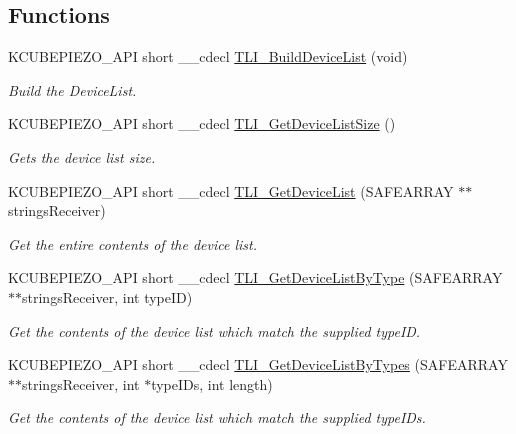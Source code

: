 \subsection*{Functions}
\begin{DoxyCompactItemize}
\item 
K\+C\+U\+B\+E\+P\+I\+E\+Z\+O\+\_\+\+A\+PI short \+\_\+\+\_\+cdecl \hyperlink{group___k_cube_piezo_gab6828a5e531b086cda3ae73a69f74ee6}{T\+L\+I\+\_\+\+Build\+Device\+List} (void)
\begin{DoxyCompactList}\small\item\em Build the Device\+List. \end{DoxyCompactList}\item 
K\+C\+U\+B\+E\+P\+I\+E\+Z\+O\+\_\+\+A\+PI short \+\_\+\+\_\+cdecl \hyperlink{group___k_cube_piezo_ga2f060ca4d8c6af365c33f11a0a823184}{T\+L\+I\+\_\+\+Get\+Device\+List\+Size} ()
\begin{DoxyCompactList}\small\item\em Gets the device list size. \end{DoxyCompactList}\item 
K\+C\+U\+B\+E\+P\+I\+E\+Z\+O\+\_\+\+A\+PI short \+\_\+\+\_\+cdecl \hyperlink{group___k_cube_piezo_ga5abcb54a4ea8e490a9e6833544eb222b}{T\+L\+I\+\_\+\+Get\+Device\+List} (S\+A\+F\+E\+A\+R\+R\+AY $\ast$$\ast$strings\+Receiver)
\begin{DoxyCompactList}\small\item\em Get the entire contents of the device list. \end{DoxyCompactList}\item 
K\+C\+U\+B\+E\+P\+I\+E\+Z\+O\+\_\+\+A\+PI short \+\_\+\+\_\+cdecl \hyperlink{group___k_cube_piezo_gacf77a9e2216306f7e9db1e7bd4f4219f}{T\+L\+I\+\_\+\+Get\+Device\+List\+By\+Type} (S\+A\+F\+E\+A\+R\+R\+AY $\ast$$\ast$strings\+Receiver, int type\+ID)
\begin{DoxyCompactList}\small\item\em Get the contents of the device list which match the supplied type\+ID. \end{DoxyCompactList}\item 
K\+C\+U\+B\+E\+P\+I\+E\+Z\+O\+\_\+\+A\+PI short \+\_\+\+\_\+cdecl \hyperlink{group___k_cube_piezo_gadcb307bcf088e1e0aab9efcd571b12e7}{T\+L\+I\+\_\+\+Get\+Device\+List\+By\+Types} (S\+A\+F\+E\+A\+R\+R\+AY $\ast$$\ast$strings\+Receiver, int $\ast$type\+I\+Ds, int length)
\begin{DoxyCompactList}\small\item\em Get the contents of the device list which match the supplied type\+I\+Ds. \end{DoxyCompactList}\item 
$$
\end{DoxyCompactItemize}
